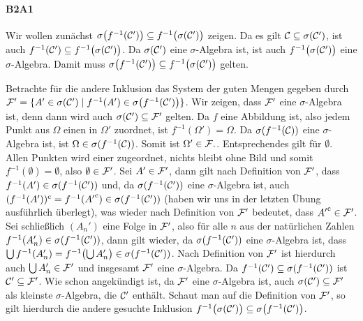 \documentclass{article}
\begin{document}
\paragraph{B2A1}
Wir wollen zunächst $\sigma\bigl(f^{-1}({\cal C}')\bigr)\subseteq f^{-1}\bigl(\sigma({\cal C}')\bigr)$ zeigen.
Da es gilt ${\cal C}\subseteq\sigma({\cal C}')$, ist auch $f^{-1}({\cal C}')\subseteq f^{-1}\bigl(\sigma({\cal C}')\bigr)$.
Da $\sigma({\cal C}')$ eine $\sigma$-Algebra ist, ist auch $f^{-1}\bigl(\sigma({\cal C}')\bigr)$ eine $\sigma$-Algebra.
Damit muss $\sigma\bigl(f^{-1}({\cal C}')\bigr)\subseteq f^{-1}\bigl(\sigma({\cal C}')\bigr)$ gelten.

Betrachte für die andere Inklusion das System der guten Mengen gegeben durch ${\cal F}'=\{A'\in\sigma({\cal C}')\mid f^{-1}(A')\in\sigma\bigl(f^{-1}({\cal C}')\bigr)\}$.
Wir zeigen, dass ${\cal F}'$ eine $\sigma$-Algebra ist, denn dann wird auch $\sigma({\cal C}')\subseteq{\cal F}'$ gelten.
Da $f$ eine Abbildung ist, also jedem Punkt aus $\Omega$ einen in $\Omega'$ zuordnet, ist $f^{-1}(\Omega')=\Omega$.
Da $\sigma(f^{-1}({\cal C}))$ eine $\sigma$-Algebra ist, ist $\Omega\in\sigma(f^{-1}({\cal C}))$.
Somit ist $\Omega'\in{\cal F}.$.
Entsprechendes gilt für $\emptyset$. Allen Punkten wird einer zugeordnet, nichts bleibt ohne Bild und somit $f^{-1}(\emptyset)=\emptyset$, also $\emptyset\in{\cal F}'$.
Sei $A'\in{\cal F}'$, dann gilt nach Definition von ${\cal F}'$, dass $f^{-1}(A')\in\sigma(f^{-1}({\cal C}'))$ und, da $\sigma(f^{-1}({\cal C}'))$ eine $\sigma$-Algebra ist, auch $(f^{-1}(A'))^\mathrm{c}=f^{-1}({A'}^\mathrm{c})\in\sigma(f^{-1}({\cal C}'))$ (haben wir uns in der letzten Übung ausführlich überlegt), was wieder nach Definition von ${\cal F}'$ bedeutet, dass ${A'}^\mathrm{c}\in{\cal F}'$.
Sei schließlich $(A_n')$ eine Folge in ${\cal F}'$, also für alle $n$ aus der natürlichen Zahlen $f^{-1}(A_n')\in\sigma(f^{-1}({\cal C}'))$, dann gilt wieder, da $\sigma(f^{-1}({\cal C}'))$ eine $\sigma$-Algebra ist, dass $\bigcup f^{-1}(A_n')=f^{-1}\bigl(\bigcup A_n'\bigr)\in\sigma(f^{-1}({\cal C}'))$.
Nach Definition von ${\cal F}'$ ist hierdurch auch $\bigcup A_n'\in{\cal F}'$ und insgesamt ${\cal F}'$ eine $\sigma$-Algebra. Da $f^{-1}({\cal C}')\subseteq \sigma(f^{-1}({\cal C}'))$ ist ${\cal C}'\subseteq{\cal F}'$.
Wie schon angekündigt ist, da ${\cal F}'$ eine $\sigma$-Algebra ist, auch $\sigma({\cal C}')\subseteq{\cal F}'$ als kleinste $\sigma$-Algebra, die ${\cal C}'$ enthält.
Schaut man auf die Definition von ${\cal F}'$, so gilt hierdurch die andere gesuchte Inklusion $f^{-1}\bigl(\sigma({\cal C}')\bigr)\subseteq\sigma\bigl(f^{-1}({\cal C}')\bigr)$.
\newpage
\end{document}
